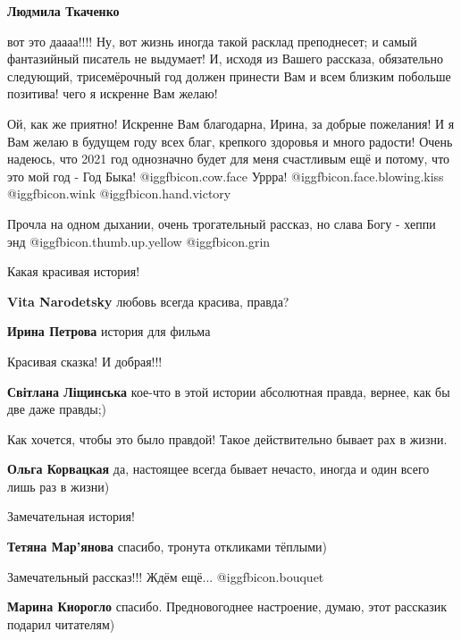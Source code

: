 \begin{itemize}
\begin{itemize}
\textbf{Людмила Ткаченко} 

вот это даааа!!!! Ну, вот жизнь иногда такой расклад преподнесет; и самый
фантазийный писатель не выдумает! И, исходя из Вашего рассказа, обязательно
следующий, трисемёрочный год должен принести Вам и всем близким побольше
позитива! чего я искренне Вам желаю!


Ой, как же приятно! Искренне Вам благодарна, Ирина, за добрые пожелания! И я
Вам желаю в будущем году всех благ, крепкого здоровья и много радости! Очень
надеюсь, что 2021 год однозначно будет для меня счастливым ещё и потому, что
это мой год - Год Быка!  @igg{fbicon.cow.face} Уррра! @igg{fbicon.face.blowing.kiss}  @igg{fbicon.wink} @igg{fbicon.hand.victory}

Прочла на одном дыхании, очень трогательный рассказ, но слава Богу - хеппи энд @igg{fbicon.thumb.up.yellow}  @igg{fbicon.grin} 

\end{itemize} %

Какая красивая история!

\begin{itemize} %
\textbf{Vita Narodetsky} любовь всегда красива, правда?

\textbf{Ирина Петрова} история для фильма
\end{itemize} %

Красивая сказка! И добрая!!!

\begin{itemize} %
\textbf{Світлана Ліщинська} кое-что в этой истории абсолютная правда, вернее, как бы две даже правды;)
\end{itemize} %

Как хочется, чтобы это было правдой! Такое действительно бывает рах в жизни.

\textbf{Ольга Корвацкая} да, настоящее всегда бывает нечасто, иногда и один всего лишь раз в жизни)

Замечательная история!

\textbf{Тетяна Мар'янова} спасибо, тронута откликами тёплыми)

Замечательный рассказ!!! Ждём ещё...  @igg{fbicon.bouquet} 

\textbf{Марина Киорогло} спасибо. Предновогоднее настроение, думаю, этот рассказик подарил читателям)


\end{itemize}
